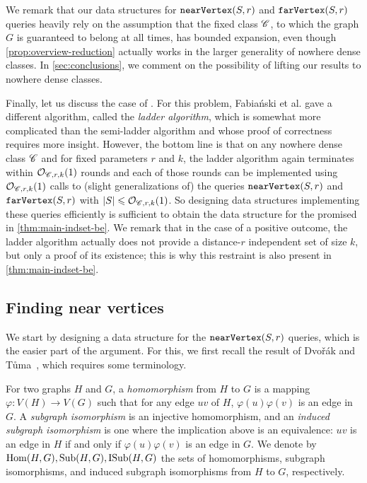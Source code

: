 We remark that our data structures for $\mathtt{nearVertex}(S,r)$ and $\mathtt{farVertex}(S,r)$ queries heavily rely on the assumption that the fixed class $\mathscr C$, to which the graph $G$ is guaranteed to belong at all times, has bounded expansion, even though \cref{prop:overview-reduction} actually works in the larger generality of nowhere dense classes. In \cref{sec:conclusions}, we comment on the possibility of lifting our results to nowhere dense classes.

\medskip

Finally, let us discuss the case of . For this problem, Fabia\'nski et al. gave a different algorithm, called the \emph{ladder algorithm}, which is somewhat more complicated than the semi-ladder algorithm and whose proof of correctness requires more insight. However, the bottom line is that on any nowhere dense class $\mathscr C$ and for fixed parameters $r$ and $k$, the ladder algorithm again terminates within $\mathcal{O}_{\mathscr C,r,k}(1)$ rounds and each of those rounds can be implemented using $\mathcal{O}_{\mathscr C,r,k}(1)$ calls to (slight generalizations of) the queries $\mathtt{nearVertex}(S,r)$ and $\mathtt{farVertex}(S,r)$ with $|S|\leqslant \mathcal{O}_{\mathscr C,r,k}(1)$. So designing  data structures implementing these queries efficiently is sufficient to obtain the data structure for the  promised in \cref{thm:main-indset-be}. We remark that in the case of a positive outcome, the ladder algorithm actually does not provide a distance-$r$ independent set of size $k$, but only a proof of its existence; this is why this restraint is also present in \cref{thm:main-indset-be}.

\subsection{Finding near vertices}

We start by designing a data structure for the $\mathtt{nearVertex}(S,r)$ queries, which is the easier part of the argument. For this, we first recall the result of Dvo\v{r}\'ak and T\r{u}ma~\cite{DvorakT13}, which requires some terminology.

For two graphs $H$ and $G$, a \emph{homomorphism} from $H$ to $G$ is a mapping $\varphi\colon V(H)\to V(G)$ such that for any edge $uv$ of $H$, $\varphi(u)\varphi(v)$ is an edge in $G$. A \emph{subgraph isomorphism} is an injective homomorphism, and an \emph{induced subgraph isomorphism} is one where the implication above is an equivalence: $uv$ is an edge in $H$ if and only if $\varphi(u)\varphi(v)$ is an edge in $G$. We denote by $\mathrm{Hom}(H,G),\mathrm{Sub}(H,G),\mathrm{ISub}(H,G)$ the sets of homomorphisms, subgraph isomorphisms, and induced subgraph isomorphisms from $H$ to $G$, respectively.

